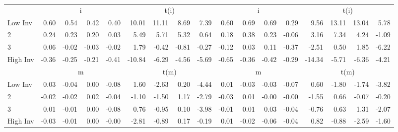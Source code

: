 \begin{table}[!ht]
\begin{tabular}{lrrrrrrrrrrrrrrrr}
  
     & \multicolumn{4}{c}{i} & \multicolumn{4}{c}{t(i)}  & \multicolumn{4}{c}{i} & \multicolumn{4}{c}{t(i)}   \\
     \cmidrule(r){2-5} \cmidrule(r){6-9}  \cmidrule(r){10-13} \cmidrule(r){14-17} 
    Low Inv  & 0.60  & 0.54  & 0.42  & 0.40  & 10.01  & 11.11  & 8.69  & 7.39  & 0.60  & 0.69  & 0.69  & 0.29  & 9.56  & 13.11  & 13.04  & 5.78   \\
    2  & 0.24  & 0.23  & 0.20  & 0.03  & 5.49  & 5.71  & 5.32  & 0.64  & 0.18  & 0.38  & 0.23  & -0.06  & 3.16  & 7.34  & 4.24  & -1.09   \\
    3  & 0.06  & -0.02  & -0.03  & -0.02  & 1.79  & -0.42  & -0.81  & -0.27  & -0.12  & 0.03  & 0.11  & -0.37  & -2.51  & 0.50  & 1.85  & -6.22   \\
    High Inv  & -0.36  & -0.25  & -0.21  & -0.41  & -10.84  & -6.29  & -4.56  & -5.69  & -0.65  & -0.36  & -0.42  & -0.29  & -14.34  & -5.71  & -6.36  & -4.21   \\
    
  
     & \multicolumn{4}{c}{m} & \multicolumn{4}{c}{t(m)}  & \multicolumn{4}{c}{m} & \multicolumn{4}{c}{t(m)}   \\
     \cmidrule(r){2-5} \cmidrule(r){6-9}  \cmidrule(r){10-13} \cmidrule(r){14-17} 
    Low Inv  & 0.03  & -0.04  & 0.00  & -0.08  & 1.60  & -2.63  & 0.20  & -4.44  & 0.01  & -0.03  & -0.03  & -0.07  & 0.60  & -1.80  & -1.74  & -3.82   \\
    2  & -0.02  & -0.02  & 0.02  & -0.04  & -1.10  & -1.50  & 1.17  & -2.79  & -0.03  & 0.01  & -0.00  & -0.00  & -1.55  & 0.66  & -0.07  & -0.20   \\
    3  & 0.01  & -0.01  & 0.00  & -0.08  & 0.76  & -0.95  & 0.10  & -3.98  & -0.01  & 0.01  & 0.03  & -0.04  & -0.76  & 0.63  & 1.31  & -2.07   \\
    High Inv  & -0.03  & -0.01  & 0.00  & -0.00  & -2.81  & -0.89  & 0.17  & -0.19  & 0.01  & -0.02  & -0.06  & -0.04  & 0.82  & -0.88  & -2.59  & -1.60   \\
    
  
  \bottomrule
\end{tabular}
\label{tbl:32_Size_BM_Inv_F17}
\end{table}